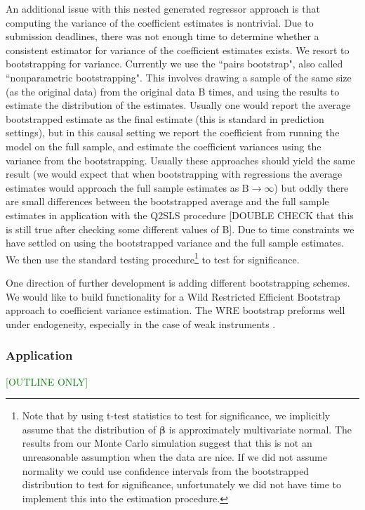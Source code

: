 \documentclass[12pt]{article}
\begin{document}
An additional issue with this nested generated regressor approach is that computing the variance of the coefficient estimates is nontrivial. Due to submission deadlines, there was not enough time to determine whether a consistent estimator for variance of the coefficient estimates exists. We resort to bootstrapping for variance. Currently we use the ``pairs bootstrap", also called ``nonparametric bootstrapping". This involves drawing a sample of the same size (as the original data) from the original data B times, and using the results to estimate the distribution of the estimates. Usually one would report the average bootstrapped estimate as the final estimate (this is standard in prediction settings), but in this causal setting we report the coefficient from running the model on the full sample, and estimate the coefficient variances using the variance from the bootstrapping. Usually these approaches should yield the same result (we would expect that when bootstrapping with regressions the average estimates would approach the full sample estimates as $\mathrm{B} \longrightarrow \infty$) but oddly there are small differences between the bootstrapped average and the full sample estimates in application with the Q2SLS procedure \textcolor{BrickRed}{[DOUBLE CHECK that this is still true after checking some different values of B]}. Due to time constraints we have settled on using the bootstrapped variance and the full sample estimates. We then use the standard testing procedure\footnote{Note that by using t-test statistics to test for significance, we implicitly assume that the distribution of $\bm{\beta}$ is approximately multivariate normal. The results from our Monte Carlo simulation suggest that this is not an unreasonable assumption when the data are nice. If we did not assume normality we could use confidence intervals from the bootstrapped distribution to test for significance, unfortunately we did not have time to implement this into the estimation procedure.} to test for significance.

One direction of further development is adding different bootstrapping schemes. We would like to build functionality for a Wild Restricted Efficient Bootstrap approach to coefficient variance estimation. The WRE bootstrap preforms well under endogeneity, especially in the case of weak instruments \cite{wild_boot}.

\subsubsection{Application}
\textcolor{Green}{[OUTLINE ONLY]}
\end{document}
